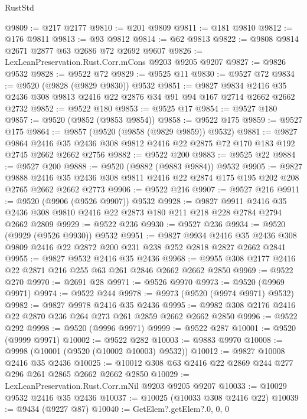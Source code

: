 \begin{lexlean}{RustStd}
\begin{coremodule}
@9809 := @217 @2177
@9810 := @201 @9809
@9811 := @181 @9810
@9812 := @176 @9811
@9813 := @93 @9812
@9814 := @62 @9813
@9822 := @9808 @9814 @2671 @2877 @63 @2686 @72 @2692 @9607
@9826 := LexLeanPreservation.Rust.Corr.mCons @9203 @9205 @9207
@9827 := @9826 @9532
@9828 := @9522 @72
@9829 := @9525 @11
@9830 := @9527 @72
@9834 := @9520 (@9828 (@9829 @9830)) @9532
@9851 := @9827
    @9834
    @2416
    @35
    @2436
    @308
    @9813
    @2416
    @22
    @2876
    @34
    @91
    @94
    @167
    @2714
    @2662
    @2662
    @2732
@9852 := @9522 @180
@9853 := @9525 @17
@9854 := @9527 @180
@9857 := @9520 (@9852 (@9853 @9854))
@9858 := @9522 @175
@9859 := @9527 @175
@9864 := @9857 (@9520 (@9858 (@9829 @9859)) @9532)
@9881 := @9827
    @9864
    @2416
    @35
    @2436
    @308
    @9812
    @2416
    @22
    @2875
    @72
    @170
    @183
    @192
    @2745
    @2662
    @2662
    @2756
@9882 := @9522 @200
@9883 := @9525 @22
@9884 := @9527 @200
@9888 := @9520 (@9882 (@9883 @9884)) @9532
@9905 := @9827
    @9888
    @2416
    @35
    @2436
    @308
    @9811
    @2416
    @22
    @2874
    @175
    @195
    @202
    @208
    @2765
    @2662
    @2662
    @2773
@9906 := @9522 @216
@9907 := @9527 @216
@9911 := @9520 (@9906 (@9526 @9907)) @9532
@9928 := @9827
    @9911
    @2416
    @35
    @2436
    @308
    @9810
    @2416
    @22
    @2873
    @180
    @211
    @218
    @228
    @2784
    @2794
    @2662
    @2809
@9929 := @9522 @236
@9930 := @9527 @236
@9934 := @9520 (@9929 (@9526 @9930)) @9532
@9951 := @9827
    @9934
    @2416
    @35
    @2436
    @308
    @9809
    @2416
    @22
    @2872
    @200
    @231
    @238
    @252
    @2818
    @2827
    @2662
    @2841
@9955 := @9827 @9532 @2416 @35 @2436
@9968 := @9955 @308 @2177 @2416 @22 @2871 @216 @255 @63 @261 @2846 @2662 @2662 @2850
@9969 := @9522 @270
@9970 := @2691 @28
@9971 := @9526 @9970
@9973 := @9520 (@9969 @9971)
@9974 := @9522 @244
@9978 := @9973 (@9520 (@9974 @9971) @9532)
@9982 := @9827 @9978 @2416 @35 @2436
@9995 := @9982 @308 @2176 @2416 @22 @2870 @236 @264 @273 @261 @2859 @2662 @2662 @2850
@9996 := @9522 @292
@9998 := @9520 (@9996 @9971)
@9999 := @9522 @287
@10001 := @9520 (@9999 @9971)
@10002 := @9522 @282
@10003 := @9883 @9970
@10008 := @9998 (@10001 (@9520 (@10002 @10003) @9532))
@10012 := @9827 @10008 @2416 @35 @2436
@10025 := @10012 @308 @63 @2416 @22 @2869 @244 @277 @296 @261 @2865 @2662 @2662 @2850
@10029 := LexLeanPreservation.Rust.Corr.mNil @9203 @9205 @9207
@10033 := @10029 @9532 @2416 @35 @2436
@10037 := @10025 (@10033 @308 @2416 @22)
@10039 := @9434 (@9227 @87)
@10040 := GetElem?.getElem?.{0, 0, 0}

\end{coremodule}
\end{lexlean}
